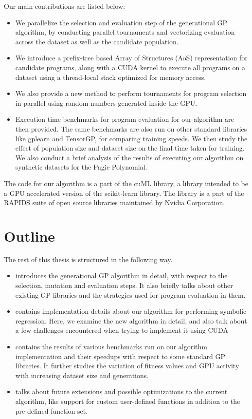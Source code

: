 Our main contributions are listed below:
\begin{itemize}
  \item We parallelize the selection and evaluation step of the generational GP algorithm, by conducting parallel tournaments and vectorizing evaluation across the dataset as well as the candidate population. 
  \item We introduce a prefix-tree based Array of Structures (AoS) representation for candidate programs, along with a CUDA kernel to execute all programs on a dataset using a thread-local stack optimized for memory access. 
  \item We also provide a new method to perform tournaments for program selection in parallel using random numbers generated inside the GPU. 
  \item Execution time benchmarks for program evaluation for our algorithm are then provided. The same benchmarks are also run on other standard libraries like gplearn\citep{gplearn} and TensorGP\citep{baeta2021tensorgp}, for comparing training speeds. We then study the effect of population size and dataset size on the final time taken for training. We also conduct a brief analysis of the results of executing our algorithm on synthetic datasets for the Pagie Polynomial\cite{Pagie1997}.
\end{itemize}

The code for our algorithm is a part of the cuML library\citep{raschka2020machine}, a library intended to be a GPU accelerated version of the scikit-learn
library\citep{scikit-learn}. The library is a part of the RAPIDS suite of open source libraries maintained by Nvidia Corporation.

\section{Outline}
\label{intro:outline}

The rest of this thesis is structured in the following way. 
\begin{itemize}
  \item {} introduces the generational GP algorithm in detail, with respect to the selection, mutation and evaluation steps. It also briefly talks about other existing GP libraries and the strategies used for program evaluation in them. 
  \item {} contains implementation details about our algorithm for performing symbolic regression. Here, we examine the new algorithm in detail, and also talk about a few challenges encountered when trying to implement it using CUDA
  \item {} contains the results of various benchmarks run on our algorithm implementation and their speedups with respect to some standard GP libraries. It further studies the variation of fitness values and GPU activity with increasing dataset size and generations.
  \item {} talks about future extensions and possible optimizations to the current algorithm, like support for custom user-defined functions in addition to the pre-defined function set.
\end{itemize}
